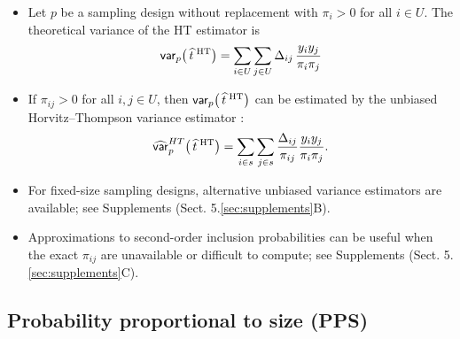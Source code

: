 \documentclass{my_eth_beamer}
\numberwithin{equation}{section}
\newcommand{\NR}{5}
\begin{document}
\begin{frame}
    \begin{itemize}
    \setlength{\itemsep}{2pt}
        \item Let $p$ be a sampling design without replacement with $\pi_i>0$
            for all $i\in U$. The theoretical \alert{variance of the HT
            estimator} is
            \begin{equation*}
                \mathsf{var}_p\big(\,\widehat{t}^{\;\mathrm{HT}}\big) = \sum_{i \in U}\sum_{j \in U} \Delta_{ij}
                    \,\frac{y_iy_j}{\pi_i\pi_j}
            \end{equation*}
        \item If $\pi_{ij}>0$ for all $i,j\in U$, then $\mathsf{var}_p\big(\,\widehat{t}^{\;\mathrm{HT}}\big)$
            can be estimated by the unbiased \alert{Horvitz--Thompson variance
            estimator} \citep{horvitz_thompson_1952}:
            \begin{equation*}
                \widehat{\mathsf{var}}_p^{HT}\big(\,\widehat{t}^{\;\mathrm{HT}}\big) = \sum_{i \in s}
                    \sum_{j \in s} \frac{\Delta_{ij}}{\pi_{ij}}
                    \frac{y_iy_j}{\pi_i\pi_j}.
            \end{equation*}
        \item For \alert{fixed-size sampling designs}, alternative unbiased
            variance estimators are available; see Supplements (Sect.
            \NR.\ref{sec:supplements}B).
        \item \alert{Approximations} to second-order inclusion probabilities
            can be useful when the exact $\pi_{ij}$ are unavailable or
            difficult to compute; see Supplements  (Sect.
            \NR.\ref{sec:supplements}C).
    \end{itemize}
\end{frame}

\subsection{Probability proportional to size (PPS)}
\end{document}
